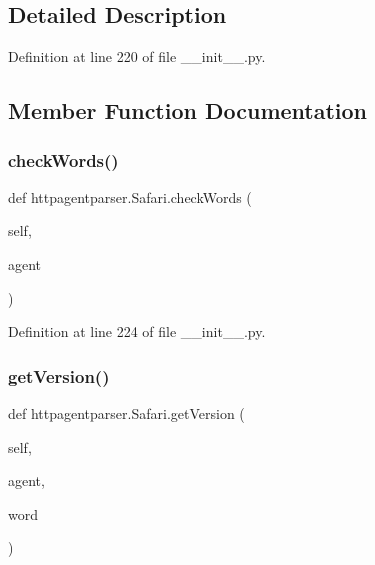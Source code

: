 \subsection{Detailed Description}


Definition at line 220 of file \+\_\+\+\_\+init\+\_\+\+\_\+.\+py.



\subsection{Member Function Documentation}
\hypertarget{classhttpagentparser_1_1_safari_a5349dc1dbbbd4a3a8696dae111740ca3}{}\label{classhttpagentparser_1_1_safari_a5349dc1dbbbd4a3a8696dae111740ca3} 
\subsubsection{\texorpdfstring{check\+Words()}{checkWords()}}
{\footnotesize\ttfamily def httpagentparser.\+Safari.\+check\+Words (\begin{DoxyParamCaption}\item[{}]{self,  }\item[{}]{agent }\end{DoxyParamCaption})}



Definition at line 224 of file \+\_\+\+\_\+init\+\_\+\+\_\+.\+py.

\hypertarget{classhttpagentparser_1_1_safari_ad66c2eb844665a7c172abdfe661a691a}{}\label{classhttpagentparser_1_1_safari_ad66c2eb844665a7c172abdfe661a691a} 
\subsubsection{\texorpdfstring{get\+Version()}{getVersion()}}
{\footnotesize\ttfamily def httpagentparser.\+Safari.\+get\+Version (\begin{DoxyParamCaption}\item[{}]{self,  }\item[{}]{agent,  }\item[{}]{word }\end{DoxyParamCaption})}



